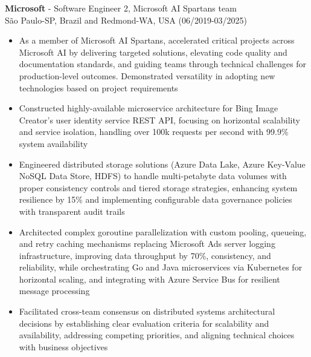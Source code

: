 
\normalsize{\textbf{Microsoft} - Software Engineer 2, Microsoft AI Spartans team}\\
\footnotesize{São Paulo-SP, Brazil and Redmond-WA, USA (06/2019-03/2025)}

\begin{itemize}
    \item \small{As a member of Microsoft AI Spartans, accelerated critical projects across Microsoft AI by delivering targeted solutions, elevating code quality and documentation standards, and guiding teams through technical challenges for production-level outcomes. Demonstrated versatility in adopting new technologies based on project requirements}

    \item \small{Constructed highly-available microservice architecture for Bing Image Creator's user identity service REST API, focusing on horizontal scalability and service isolation, handling over 100k requests per second with 99.9\% system availability}

    \item \small{Engineered distributed storage solutions (Azure Data Lake, Azure Key-Value NoSQL Data Store, HDFS) to handle multi-petabyte data volumes with proper consistency controls and tiered storage strategies, enhancing system resilience by 15\% and implementing configurable data governance policies with transparent audit trails}

    \item \small{Architected complex goroutine parallelization with custom pooling, queueing, and retry caching mechanisms replacing Microsoft Ads server logging infrastructure, improving data throughput by 70\%, consistency, and reliability, while orchestrating Go and Java microservices via Kubernetes for horizontal scaling, and integrating with Azure Service Bus for resilient message processing}

    \item \small{Facilitated cross-team consensus on distributed systems architectural decisions by establishing clear evaluation criteria for scalability and availability, addressing competing priorities, and aligning technical choices with business objectives}


\end{itemize}
